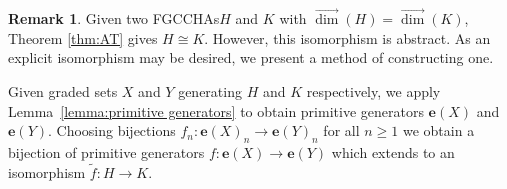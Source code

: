 \documentclass[11pt]{amsart}
\theoremstyle{definition}
\newtheorem{remark}[theorem]{Remark}
\numberwithin{equation}{section}
\newcommand{\FGCCHAs}{\textsf{FGCCHA}s\xspace}
\newcommand{\vecdim}{\overrightarrow{\dim}}
\begin{document}
\begin{remark}
    Given two \FGCCHAs $H$ and $K$ with $\vecdim(H) = \vecdim(K)$, Theorem \ref{thm:AT} gives $H \cong K$. However, this isomorphism is abstract. As an explicit isomorphism may be desired, we present a method of constructing one. 
    
    Given graded sets $X$ and $Y$ generating $H$ and $K$ respectively, we apply Lemma~\ref{lemma:primitive generators} to obtain primitive generators $\mathbf{e}(X)$ and $\mathbf{e}(Y)$. Choosing bijections $f_n:\mathbf{e}(X)_n \to \mathbf{e}(Y)_n$ for all $n \geq 1$ we obtain a bijection of primitive generators $f:\mathbf{e}(X) \to \mathbf{e}(Y)$ which extends to an isomorphism $\tilde{f}:H \to K$.
\end{remark}

\end{document}
